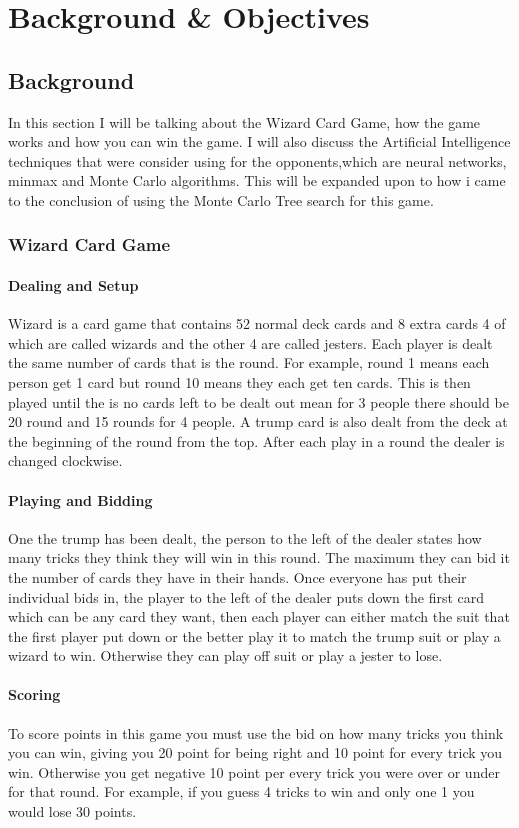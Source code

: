 \chapter{Background \& Objectives}


\section{Background}
In this section I will be talking about the Wizard Card Game, how the game works and how you can win the game. I will also discuss the Artificial Intelligence techniques that were consider using for the opponents,which are neural networks, minmax and Monte Carlo algorithms. This will be expanded upon to how i came to the conclusion of using the Monte Carlo Tree search for this game.
\subsection{Wizard Card Game}
\subsubsection{Dealing and Setup}
Wizard is a card game that contains 52 normal deck cards and 8 extra cards 4 of which are called wizards and the other 4 are called jesters.  Each player is dealt the same number of cards that is the round. For example, round 1 means each person get 1 card but round 10 means they each get ten cards. This is then played until the is no cards left to be dealt out mean for 3 people there should be 20 round and 15 rounds for 4 people.  A trump card is also dealt from the deck at the beginning of the round from the top.  After each play in a round the dealer is changed clockwise.
\subsubsection{Playing and Bidding}
One the trump has been dealt, the person to the left of the dealer states how many tricks they think they will win in this round. The maximum they can bid it the number of cards they have in their hands.  Once everyone has put their individual bids in, the player to the left of the dealer puts down the first card which can be any card they want, then each player can either match the suit that the first player put down or the better play it to match the trump suit or play a wizard to win. Otherwise they can play off suit or play a jester to lose.
\subsubsection{Scoring}
To score points in this game you must use the bid on how many tricks you think you can win, giving you 20 point for being right and 10 point for every trick you win. Otherwise you get negative 10 point per every trick you were over or under for that round.  For example, if you guess 4 tricks to win and only one 1 you would lose 30 points. 


